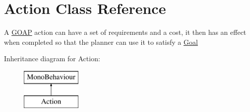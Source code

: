 \hypertarget{class_action}{}\section{Action Class Reference}
\label{class_action}


A \hyperlink{class_g_o_a_p}{G\+O\+A\+P} action can have a set of requirements and a cost, it then has an effect when completed so that the planner can use it to satisfy a \hyperlink{class_goal}{Goal}  


Inheritance diagram for Action\+:\begin{figure}[H]
\begin{center}
\leavevmode
\includegraphics[height=2.000000cm]{class_action}
\end{center}
\end{figure}
